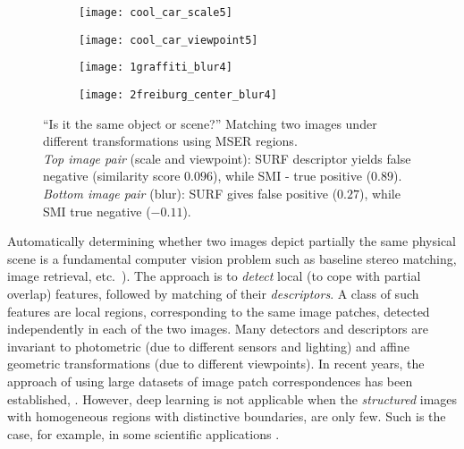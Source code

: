\documentclass[a4paper,11pt]{article}
\begin{document}
\begin{wrapfigure}{r}{0.5\textwidth}
 \vspace{-22pt} 
\begin{center}
\begin{subfigure}[b]{0.22\textwidth}
  \texttt{[image: cool\_car\_scale5]}
\end{subfigure}
\begin{subfigure}[b]{0.22\textwidth}
\texttt{[image: cool\_car\_viewpoint5]}
\end{subfigure}
\end{center}
\vspace{-22pt}
\begin{center}
\begin{subfigure}[b]{0.22\textwidth}
  \texttt{[image: 1graffiti\_blur4]}
\end{subfigure}
\begin{subfigure}[b]{0.22\textwidth}
\texttt{[image: 2freiburg\_center\_blur4]}
\end{subfigure}
\end{center}
\vspace{-20pt}
\caption{\small ``Is it the same object or scene?'' Matching two images under different transformations using MSER regions.\\ {\em Top image pair} (scale and viewpoint): SURF descriptor yields false negative (similarity score $0.096$), while SMI - true positive ($0.89$).
{\em Bottom image pair} (blur): SURF gives false positive ($0.27$), while SMI true negative ($-0.11$).}
\label{fig:intro1}
  \vspace{-16pt}
\end{wrapfigure}

Automatically determining whether two images depict partially the same physical scene is a fundamental computer vision problem such as baseline stereo matching, image retrieval, etc.~\cite{EscaleraCVPR07,Matas2002BMVC}). The approach is to {\em detect} local (to cope with partial overlap) features, followed by matching of their {\em descriptors}.
 A class of such features are local regions, corresponding to the same image patches, detected independently in each of the two images. Many detectors and descriptors are invariant to photometric (due to different sensors and lighting) and affine geometric transformations (due to different viewpoints). In recent years, the approach of using large datasets of image patch correspondences has been established, \cite{Snavely2008, ZagoruykoK15}. However,  deep learning is not applicable when the {\em structured} images with homogeneous regions with distinctive boundaries, are only few. Such is the case, for example, in some scientific applications \cite{Ranguelova2016AICCSA}.
\end{document}
